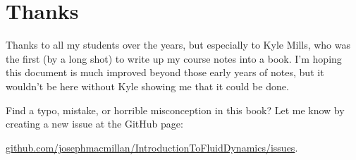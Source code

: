 \documentclass[10pt, a5paper, twoside, openany]{memoir}
\begin{document}
\section{Thanks}

Thanks to all my students over the years, but especially to Kyle Mills, who was the first (by a long shot) to write up my course notes into a book.  I'm hoping this document is much improved beyond those early years of notes, but it wouldn't be here without Kyle showing me that it could be done.

\vspace{1in}

Find a typo, mistake, or horrible misconception in this book?  Let me know by creating a new issue at the GitHub page:  

\href{https://github.com/josephmacmillan/IntroductionToFluidDynamics/issues}{github.com/josephmacmillan/IntroductionToFluidDynamics/issues}.



\mainmatter












\end{document}
